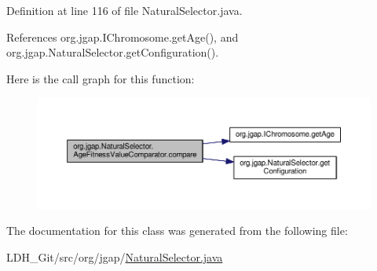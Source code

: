 Definition at line 116 of file Natural\-Selector.\-java.



References org.\-jgap.\-I\-Chromosome.\-get\-Age(), and org.\-jgap.\-Natural\-Selector.\-get\-Configuration().



Here is the call graph for this function\-:
\nopagebreak
\begin{figure}[H]
\begin{center}
\leavevmode
\includegraphics[width=350pt]{classorg_1_1jgap_1_1_natural_selector_1_1_age_fitness_value_comparator_ab7093be07c8a2a64cfe5cfe0873e5075_cgraph}
\end{center}
\end{figure}




The documentation for this class was generated from the following file\-:\begin{DoxyCompactItemize}
\item 
L\-D\-H\-\_\-\-Git/src/org/jgap/\hyperlink{_natural_selector_8java}{Natural\-Selector.\-java}\end{DoxyCompactItemize}
